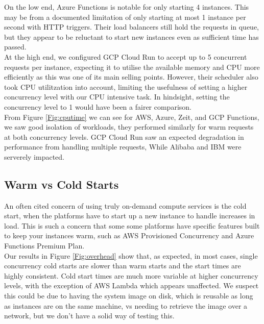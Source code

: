 \documentclass[11pt]{article}
\begin{document}
On the low end,
Azure Functions is notable for only starting 4 instances.
This may be from a documented limitation \cite{azure}
of only starting at most 1 instance per second with HTTP triggers.
Their load balancers still hold the requests in queue,
but they appear to be reluctant to start new instances even as sufficient time has passed. \\

At the high end,
we configured GCP Cloud Run to accept up to 5 concurrent requests per instance,
expecting it to utilise the available memory and CPU more efficiently as this was one of its main selling points.
However, their scheduler also took CPU utilitzation into account,
limiting the usefulness of setting a higher concurrency level with our CPU intensive task.
In hindsight, setting the concurrency level to 1 would have been a fairer comparison. \\

From Figure \ref{Fig:cputime} we can see for AWS, Azure, Zeit, and GCP Functions,
we saw good isolation of workloads,
they performed similarly for warm requests at both concurrency levels.
GCP Cloud Run saw an expected degradation in performance from handling multiple requests,
While Alibaba and IBM were serverely impacted.




\subsection{Warm vs Cold Starts}
An often cited concern of using truly on-demand compute services is the cold start,
when the platforms have to start up a new instance to handle increases in load.
This is such a concern that some some platforms have specific features
built to keep your instances warm, such as AWS Provisioned Concurrency \cite{ams}
and Azure Functions Premium Plan. \\

Our results in Figure \ref{Fig:overhead}
show that, as expected, in most cases,
single concurrency cold starts are slower than warm starts
and the start times are highly consistent.
Cold start times are much more variable at higher concurrency levels,
with the exception of AWS Lambda which appears unaffected.
We suspect this could be due to having the system image on disk,
which is reusable as long as instances are on the same machine,
vs needing to retrieve the image over a network,
but we don't have a solid way of testing this. \\
\end{document}
